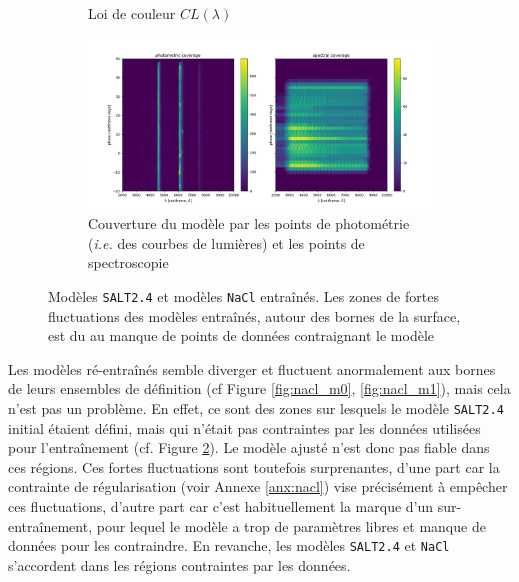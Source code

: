 \documentclass{book}
\def\nacl{\texttt{NaCl}\xspace}
\def\saltd{\texttt{SALT2.4}\xspace}
\begin{document}
\begin{figure}
\begin{subfigure}[c]{0.35\textwidth}
		\caption{Loi de couleur $CL(\lambda)$}
		\label{fig:nacl_cl}
	\end{subfigure}
	\hfill
	\begin{subfigure}[c]{0.6\textwidth}
		\centering
		\includegraphics[width=\textwidth]{figures/nacl_coverage.png}
		\caption{Couverture du modèle par les points de photométrie (\textit{i.e.} des courbes de lumières) et les points de spectroscopie}
		\label{fig:nacl_coverage}
	\end{subfigure}

	\caption{Modèles \saltd et modèles \nacl entraînés. Les zones de fortes fluctuations des modèles entraînés, autour des bornes de la surface, est du au manque de points de données contraignant le modèle}
	\label{fig:nacl_models}
\end{figure}

Les modèles ré-entraînés semble diverger et fluctuent anormalement aux bornes de leurs ensembles de définition (cf Figure \ref{fig:nacl_m0}, \ref{fig:nacl_m1}), mais cela n'est pas un problème. En effet, ce sont des zones sur lesquels le modèle \saltd initial étaient défini, mais qui n'était pas contraintes par les données utilisées pour l'entraînement (cf. Figure \ref{fig:nacl_coverage}). Le modèle ajusté n'est donc pas fiable dans ces régions. Ces fortes fluctuations sont toutefois surprenantes, d'une part car la contrainte de régularisation (voir Annexe \ref{anx:nacl}) vise précisément à empêcher ces fluctuations, d'autre part car c'est habituellement la marque d'un sur-entraînement, pour lequel le modèle a trop de paramètres libres et manque de données pour les contraindre. En revanche, les modèles \saltd et \nacl s'accordent dans les régions contraintes par les données.
\end{document}
